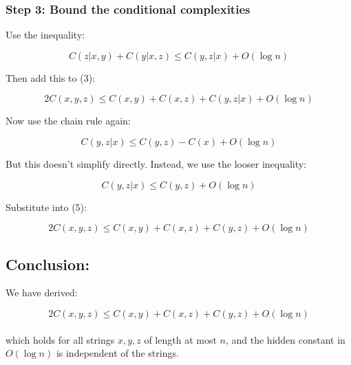 \documentclass[12pt]{article}
\begin{document}
\subsubsection*{Step 3: Bound the conditional complexities}

Use the inequality:

\[
C(z | x, y) + C(y | x, z) \leq C(y, z | x) + O(\log n) \tag{4}
\]

Then add this to (3):

\[
2C(x, y, z) \leq C(x, y) + C(x, z) + C(y, z | x) + O(\log n) \tag{5}
\]

Now use the chain rule again:

\[
C(y, z | x) \leq C(y, z) - C(x) + O(\log n) \tag{6}
\]

But this doesn't simplify directly. Instead, we use the looser inequality:

\[
C(y, z | x) \leq C(y, z) + O(\log n)
\]

Substitute into (5):

\[
2C(x, y, z) \leq C(x, y) + C(x, z) + C(y, z) + O(\log n) \tag{7}
\]

\subsection*{Conclusion:}

We have derived:

\[
2C(x, y, z) \leq C(x, y) + C(x, z) + C(y, z) + O(\log n)
\]
\\
which holds for all strings $x, y, z$ of length at most $n$, and the hidden constant in $O(\log n)$ is independent of the strings.
\end{document}
